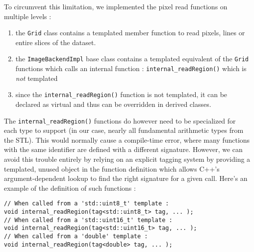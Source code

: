 {{{			%
			To circumvent this limitation, we implemented the pixel read functions on multiple levels :\begin{enumerate}
				\item the \texttt{Grid} class contains a templated member function to read pixels, lines or entire slices of the dataset.
				\item the \texttt{ImageBackendImpl} base class contains a templated equivalent of the \texttt{Grid} functions which calls an internal function : \texttt{internal\_readRegion()} which is \textit{not} templated
				\item since the \texttt{internal\_readRegion()} function is not templated, it can be declared as virtual and thus can be overridden in derived classes.
			\end{enumerate}\par
			The \texttt{internal\_readRegion()} functions do however need to be specialized for each type to support (in our case, nearly all fundamental arithmetic types from the STL). This would normally cause a compile-time error, where many functions with the same identifier are defined with a different signature. However, we can avoid this trouble entirely by relying on an explicit tagging system by providing a templated, unused object in the function definition which allows C++'s argument-dependent lookup to find the right signature for a given call. Here's an example of the definition of such functions :

			\begin{lstlisting}[style=cppbasicstyle, caption={Example of the explicit tagging system in use}]
// When called from a 'std::uint8_t' template :
void internal_readRegion(tag<std::uint8_t> tag, ... );
// When called from a 'std::uint16_t' template :
void internal_readRegion(tag<std::uint16_t> tag, ... );
// When called from a 'double' template :
void internal_readRegion(tag<double> tag, ... );
			\end{lstlisting}
	
		}

}}
